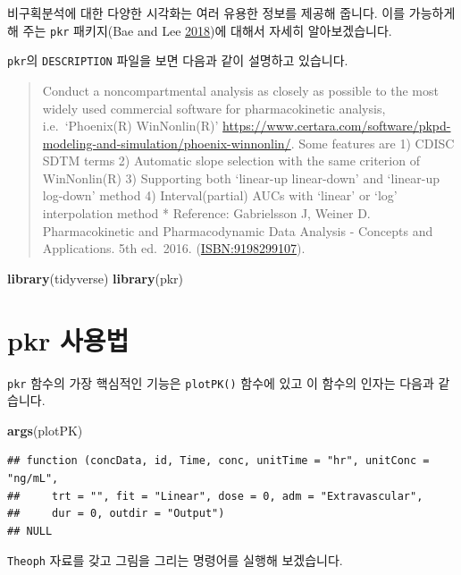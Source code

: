 \documentclass[12pt,]{krantz}
\newenvironment{Shaded}{\begin{snugshade}}{\end{snugshade}}
\newcommand{\KeywordTok}[1]{\textcolor[rgb]{0.13,0.29,0.53}{\textbf{#1}}}
\newcommand{\NormalTok}[1]{#1}
\begin{document}
비구획분석에 대한 다양한 시각화는 여러 유용한 정보를 제공해 줍니다. 이를 가능하게 해 주는 \texttt{pkr} 패키지(Bae and Lee \protect\hyperlink{ref-R-pkr}{2018})에 대해서 자세히 알아보겠습니다.

\texttt{pkr}의 \texttt{DESCRIPTION} 파일을 보면 다음과 같이 설명하고 있습니다.

\begin{quote}
Conduct a noncompartmental analysis as closely as possible to the most widely used commercial software for pharmacokinetic analysis, i.e.~`Phoenix(R) WinNonlin(R)' \url{https://www.certara.com/software/pkpd-modeling-and-simulation/phoenix-winnonlin/}.
Some features are
1) CDISC SDTM terms
2) Automatic slope selection with the same criterion of WinNonlin(R)
3) Supporting both `linear-up linear-down' and `linear-up log-down' method
4) Interval(partial) AUCs with `linear' or `log' interpolation method
* Reference: Gabrielsson J, Weiner D. Pharmacokinetic and Pharmacodynamic Data Analysis - Concepts and Applications. 5th ed.~2016. (\url{ISBN:9198299107}).
\end{quote}

\begin{Shaded}
\begin{Highlighting}[]
\KeywordTok{library}\NormalTok{(tidyverse)}
\KeywordTok{library}\NormalTok{(pkr)}
\end{Highlighting}
\end{Shaded}

\hypertarget{pkr-manual}{%
\section{pkr 사용법}\label{pkr-manual}}

\texttt{pkr} 함수의 가장 핵심적인 기능은 \texttt{plotPK()} 함수에 있고 이 함수의 인자는 다음과 같습니다.

\begin{Shaded}
\begin{Highlighting}[]
\KeywordTok{args}\NormalTok{(plotPK)}
\end{Highlighting}
\end{Shaded}

\begin{verbatim}
## function (concData, id, Time, conc, unitTime = "hr", unitConc = "ng/mL", 
##     trt = "", fit = "Linear", dose = 0, adm = "Extravascular", 
##     dur = 0, outdir = "Output") 
## NULL
\end{verbatim}

\texttt{Theoph} 자료를 갖고 그림을 그리는 명령어를 실행해 보겠습니다.
\end{document}
